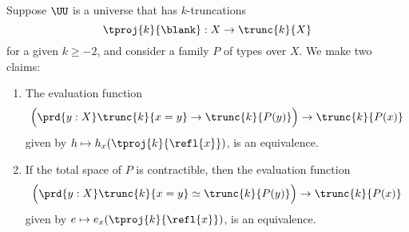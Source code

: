 \begin{lem}\label{lem:truncated-yoneda}
  Suppose $\UU$ is a universe that has $k$-truncations
  \begin{equation*}
    \tproj{k}{\blank}:X\to\trunc{k}{X}
  \end{equation*}
  for a given $k\geq-2$, and consider a family $P$ of types over $X$. We make two claims:
  \begin{enumerate}
  \item The evaluation function
    \begin{equation*}
      \Big(\prd{y:X}\trunc{k}{x=y}\to\trunc{k}{P(y)}\Big)\to \trunc{k}{P(x)}
    \end{equation*}
    given by $h\mapsto h_x(\tproj{k}{\refl{x}})$, is an equivalence.
  \item If the total space of $P$ is contractible, then the evaluation function
    \begin{equation*}
      \Big(\prd{y:X}\trunc{k}{x=y}\simeq\trunc{k}{P(y)}\Big)\to \trunc{k}{P(x)}
    \end{equation*}
    given by $e\mapsto e_x(\tproj{k}{\refl{x}})$, is an equivalence.
  \end{enumerate}
\end{lem}

